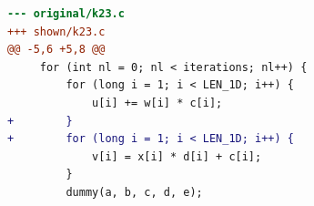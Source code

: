 \begin{lstlisting}[language=diff,basicstyle=\ttfamily\scriptsize,breaklines=true,caption={tsvc_c2/k23 — no-change (e2v6_agent_1) — shown: a rewrite the gate rejected at 'correctness'}]
--- original/k23.c
+++ shown/k23.c
@@ -5,6 +5,8 @@
     for (int nl = 0; nl < iterations; nl++) {
         for (long i = 1; i < LEN_1D; i++) {
             u[i] += w[i] * c[i];
+        }
+        for (long i = 1; i < LEN_1D; i++) {
             v[i] = x[i] * d[i] + c[i];
         }
         dummy(a, b, c, d, e);
\end{lstlisting}
